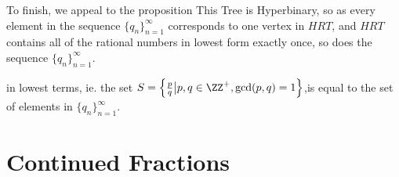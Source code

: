 \documentclass[12pt]{scrartcl}
\begin{document}
To finish, we appeal to the proposition This Tree is Hyperbinary, so as every element in the sequence $\{q_n\}_{n=1}^\infty$ corresponds to one vertex in $HRT$, and $HRT$ contains all of the rational numbers in lowest form exactly once, so does the sequence $\{q_n\}_{n=1}^\infty$.

in lowest terms, ie. the set $S = \left\{ \frac{p}{q} \big| p, q \in \ZZ^+, \gcd(p, q) = 1 \right\}$,is equal to the set of elements in $\{q_n\}_{n=1}^\infty$.


\section{Continued Fractions}
\end{document}
